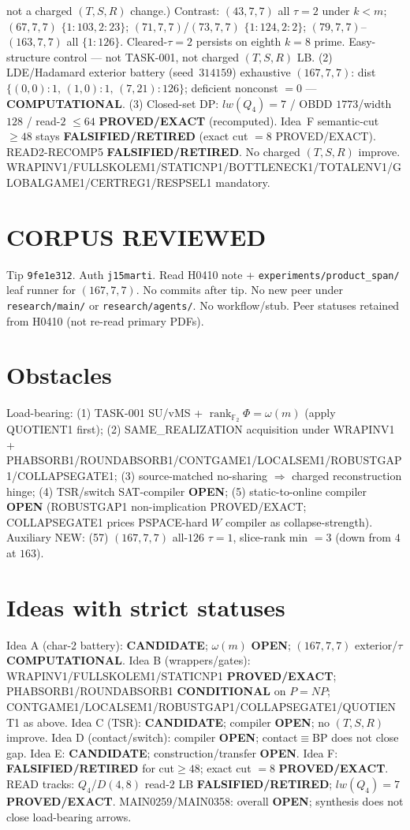 \documentclass[11pt]{article}
\begin{document}
not a charged $(T,S,R)$ change.)
Contrast: $(43,7,7)$ all $\tau{=}2$ under $k{<}m$; $(67,7,7)$ $\{1{:}103,2{:}23\}$;
$(71,7,7)$/$(73,7,7)$ $\{1{:}124,2{:}2\}$; $(79,7,7)$--$(163,7,7)$ all $\{1{:}126\}$.
Cleared-$\tau{=}2$ persists on eighth $k{=}8$ prime. Easy-structure control --- not TASK-001,
not charged $(T,S,R)$ LB.
(2) LDE/Hadamard exterior battery (seed~$314159$) exhaustive $(167,7,7)$:
dist $\{(0,0){:}1,\,(1,0){:}1,\,(7,21){:}126\}$; deficient nonconst $=0$ --- \textbf{COMPUTATIONAL}.
(3) Closed-set DP: $lw(Q_4)=7$ / OBDD $1773$/width $128$ / read-$2$ $\le64$
\textbf{PROVED/EXACT} (recomputed).
Idea~F semantic-cut $\ge48$ stays \textbf{FALSIFIED/RETIRED} (exact cut $=8$ PROVED/EXACT).
READ2-RECOMP5 \textbf{FALSIFIED/RETIRED}. No charged $(T,S,R)$ improve.
WRAPINV1/FULLSKOLEM1/STATICNP1/BOTTLENECK1/TOTALENV1/GLOBALGAME1/CERTREG1/RESPSEL1 mandatory.

\section*{CORPUS REVIEWED}
Tip \texttt{9fe1e312}. Auth \texttt{j15marti}. Read H0410 note +
\texttt{experiments/product\_span/} leaf runner for $(167,7,7)$.
No commits after tip. No new peer under \texttt{research/main/} or \texttt{research/agents/}.
No workflow/stub. Peer statuses retained from H0410 (not re-read primary PDFs).

\section*{Obstacles}
Load-bearing: (1) TASK-001 SU/vMS + $\operatorname{rank}_{\mathbb F_2}\Phi=\omega(m)$ (apply QUOTIENT1 first);
(2) SAME\_REALIZATION acquisition under WRAPINV1 + PHABSORB1/ROUNDABSORB1/CONTGAME1/LOCALSEM1/ROBUSTGAP1/COLLAPSEGATE1;
(3) source-matched no-sharing $\Rightarrow$ charged reconstruction hinge;
(4) TSR/switch SAT-compiler \textbf{OPEN};
(5) static-to-online compiler \textbf{OPEN} (ROBUSTGAP1 non-implication PROVED/EXACT;
COLLAPSEGATE1 prices PSPACE-hard $W$ compiler as collapse-strength).
Auxiliary NEW: (57) $(167,7,7)$ all-$126$ $\tau{=}1$, slice-rank min $=3$ (down from $4$ at $163$).

\section*{Ideas with strict statuses}
Idea A (char-2 battery): \textbf{CANDIDATE}; $\omega(m)$ \textbf{OPEN}; $(167,7,7)$ exterior/$\tau$ \textbf{COMPUTATIONAL}.
Idea B (wrappers/gates): WRAPINV1/FULLSKOLEM1/STATICNP1 \textbf{PROVED/EXACT};
PHABSORB1/ROUNDABSORB1 \textbf{CONDITIONAL} on $P=NP$;
CONTGAME1/LOCALSEM1/ROBUSTGAP1/COLLAPSEGATE1/QUOTIENT1 as above.
Idea C (TSR): \textbf{CANDIDATE}; compiler \textbf{OPEN}; no $(T,S,R)$ improve.
Idea D (contact/switch): compiler \textbf{OPEN}; contact$\equiv$BP does not close gap.
Idea E: \textbf{CANDIDATE}; construction/transfer \textbf{OPEN}.
Idea F: \textbf{FALSIFIED/RETIRED} for cut$\ge48$; exact cut $=8$ \textbf{PROVED/EXACT}.
READ tracks: $Q_4$/$D(4,8)$ read-$2$ LB \textbf{FALSIFIED/RETIRED}; $lw(Q_4)=7$ \textbf{PROVED/EXACT}.
MAIN0259/MAIN0358: overall \textbf{OPEN}; synthesis does not close load-bearing arrows.
\end{document}
